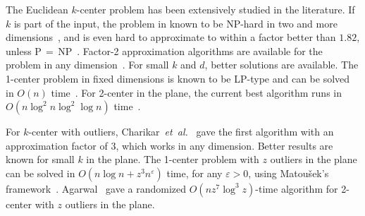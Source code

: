 \documentclass[envcountsame]{cls/cccg15}
\renewcommand{\O}{\ensuremath{{O}}}
\newcommand{\eps}{\varepsilon}
\newcommand{\etal}{{\em et~al.\/}}
\begin{document}

The Euclidean $k$-center problem has been extensively studied in the literature.
If $k$ is part of the input,
the problem in known to be NP-hard in two and more dimensions~\cite{fowler1981optimal},
and is even hard to approximate to within a factor better than $1.82$, 
unless P$\,=\,$NP~\cite{feder1988optimal}.
Factor-2 approximation algorithms are available for the problem 
in any dimension~\cite{gonzalez1985clustering,feder1988optimal}.
For small $k$ and $d$, %
better solutions are available.
The 1-center problem in fixed dimensions is known to be LP-type 
and can be solved in $O(n)$ time~\cite{chazelle1996linear}.
For 2-center in the plane, the current best algorithm
runs in $\O(n \log^2 n \log^2 \log n)$ time~\cite{chan1999more}.


For $k$-center with outliers, Charikar~\etal~\cite{charikar2001algorithms} 
gave the first algorithm with an approximation factor of $3$, 
which works in any dimension.
Better results are known for small $k$ in the plane.
The 1-center problem with $z$ outliers in the plane can be solved 
in $\O(n \log n + z^{3} n^{\eps})$ time, for any $\eps > 0$, 
using Matou{\v{s}}ek's framework~\cite{matouvsek1995geometric}.
Agarwal~\cite{agarwal2008efficient} gave a randomized 
$\O(n z^{7} \log^3 z)$-time algorithm for 2-center with $z$ outliers in the plane.
\end{document}
